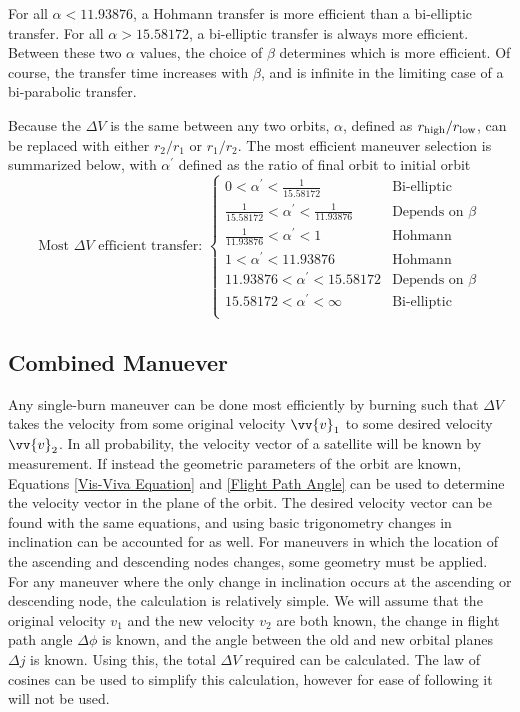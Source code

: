 \documentclass[../basicOrbitalDynamics.tex]{subfiles}
\begin{document}
For all $\alpha<11.93876$, a Hohmann transfer is more efficient than a bi-elliptic transfer. For all $\alpha>15.58172$, a bi-elliptic transfer is always more efficient. Between these two $\alpha$ values, the choice of $\beta$ determines which is more efficient. Of course, the transfer time increases with $\beta$, and is infinite in the limiting case of a bi-parabolic transfer.

Because the $\Delta V$ is the same between any two orbits, $\alpha$, defined as ${r}_\text{high}/{r}_\text{low}$, can be replaced with either $r_2/r_1$ or $r_1/r_2$. The most efficient maneuver selection is summarized below, with $\alpha^\prime$ defined as the ratio of final orbit to initial orbit
\begin{equation*}
    \text{Most }\Delta V\text{ efficient transfer: }
    \begin{cases}
        0<\alpha^\prime<\frac{1}{15.58172}                  & \text{Bi-elliptic} \\
        \frac{1}{15.58172}<\alpha^\prime<\frac{1}{11.93876} & \text{Depends on }\beta \\
        \frac{1}{11.93876}<\alpha^\prime<1                  & \text{Hohmann} \\
        1<\alpha^\prime<11.93876                            & \text{Hohmann} \\
        11.93876<\alpha^\prime<15.58172                     & \text{Depends on }\beta \\
        15.58172<\alpha^\prime<\infty                       & \text{Bi-elliptic} \\
    \end{cases}
\end{equation*}

\bigskip\bigskip
\subsection{Combined Manuever}

Any single-burn maneuver can be done most efficiently by burning such that $\Delta V$ takes the velocity from some original velocity $\vv{v}_1$ to some desired velocity $\vv{v}_2$. In all probability, the velocity vector of a satellite will be known by measurement. If instead the geometric parameters of the orbit are known, Equations  \eqref{Vis-Viva Equation} and  \eqref{Flight Path Angle} can be used to determine the velocity vector in the plane of the orbit. The desired velocity vector can be found with the same equations, and using basic trigonometry changes in inclination can be accounted for as well. For maneuvers in which the location of the ascending and descending nodes changes, some geometry must be applied. For any maneuver where the only change in inclination occurs at the ascending or descending node, the calculation is relatively simple. We will assume that the original velocity $v_1$ and the new velocity $v_2$ are both known, the change in flight path angle $\Delta \phi$ is known, and the angle between the old and new orbital planes $\Delta j$ is known. Using this, the total $\Delta V$ required can be calculated. The law of cosines can be used to simplify this calculation, however for ease of following it will not be used.
\end{document}
